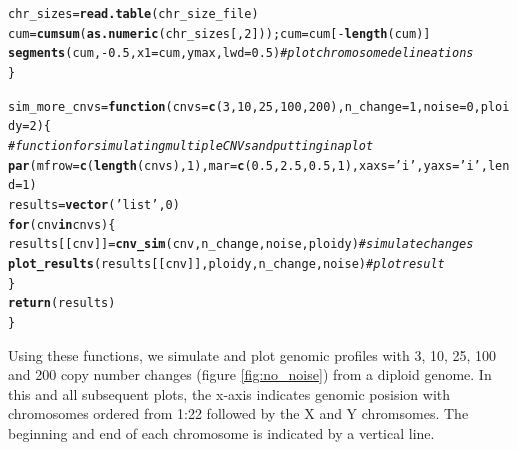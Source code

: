 \documentclass[12pt]{article}\usepackage[]{graphicx}\usepackage[]{color}
\makeatletter
\newcommand{\hlnum}[1]{\textcolor[rgb]{0.686,0.059,0.569}{#1}}%
\newcommand{\hlstr}[1]{\textcolor[rgb]{0.192,0.494,0.8}{#1}}%
\newcommand{\hlcom}[1]{\textcolor[rgb]{0.678,0.584,0.686}{\textit{#1}}}%
\newcommand{\hlopt}[1]{\textcolor[rgb]{0,0,0}{#1}}%
\newcommand{\hlstd}[1]{\textcolor[rgb]{0.345,0.345,0.345}{#1}}%
\newcommand{\hlkwa}[1]{\textcolor[rgb]{0.161,0.373,0.58}{\textbf{#1}}}%
\newcommand{\hlkwb}[1]{\textcolor[rgb]{0.69,0.353,0.396}{#1}}%
\newcommand{\hlkwc}[1]{\textcolor[rgb]{0.333,0.667,0.333}{#1}}%
\newcommand{\hlkwd}[1]{\textcolor[rgb]{0.737,0.353,0.396}{\textbf{#1}}}%
\newenvironment{kframe}{%
 \def\at@end@of@kframe{}%
 \ifinner\ifhmode%
  \def\at@end@of@kframe{\end{minipage}}%
  \begin{minipage}{\columnwidth}%
 \fi\fi%
 \def\FrameCommand##1{\hskip\@totalleftmargin \hskip-\fboxsep
 \colorbox{shadecolor}{##1}\hskip-\fboxsep
     \hskip-\linewidth \hskip-\@totalleftmargin \hskip\columnwidth}%
 \MakeFramed {\advance\hsize-\width
   \@totalleftmargin\z@ \linewidth\hsize
   \@setminipage}}%
 {\par\unskip\endMakeFramed%
 \at@end@of@kframe}
\newenvironment{knitrout}{}{} %
\makeatother
\begin{document}
\begin{knitrout}
\begin{kframe}
\begin{alltt}
  \hlstd{chr_sizes} \hlkwb{=} \hlkwd{read.table}\hlstd{(chr_size_file)}
  \hlstd{cum} \hlkwb{=} \hlkwd{cumsum}\hlstd{(}\hlkwd{as.numeric}\hlstd{(chr_sizes[,}\hlnum{2}\hlstd{])); cum} \hlkwb{=} \hlstd{cum[}\hlopt{-}\hlkwd{length}\hlstd{(cum)]}
  \hlkwd{segments}\hlstd{( cum,} \hlopt{-}\hlnum{0.5}\hlstd{,} \hlkwc{x1} \hlstd{= cum, ymax,} \hlkwc{lwd}\hlstd{=}\hlnum{0.5}\hlstd{)} \hlcom{#plot chromosome delineations}
\hlstd{\}}

\hlstd{sim_more_cnvs} \hlkwb{=} \hlkwa{function}\hlstd{(}\hlkwc{cnvs} \hlstd{=} \hlkwd{c}\hlstd{(}\hlnum{3}\hlstd{,}\hlnum{10}\hlstd{,}\hlnum{25}\hlstd{,}\hlnum{100}\hlstd{,}\hlnum{200}\hlstd{),} \hlkwc{n_change}\hlstd{=}\hlnum{1}\hlstd{,} \hlkwc{noise}\hlstd{=}\hlnum{0}\hlstd{,} \hlkwc{ploidy}\hlstd{=}\hlnum{2}\hlstd{)\{}
  \hlcom{#function for simulating multiple CNVs and putting in a plot}
  \hlkwd{par}\hlstd{(}\hlkwc{mfrow}\hlstd{=}\hlkwd{c}\hlstd{(}\hlkwd{length}\hlstd{(cnvs),}\hlnum{1}\hlstd{),} \hlkwc{mar}\hlstd{=}\hlkwd{c}\hlstd{(}\hlnum{0.5}\hlstd{,}\hlnum{2.5}\hlstd{,}\hlnum{0.5}\hlstd{,}\hlnum{1}\hlstd{),} \hlkwc{xaxs}\hlstd{=}\hlstr{'i'}\hlstd{,} \hlkwc{yaxs}\hlstd{=}\hlstr{'i'}\hlstd{,} \hlkwc{lend}\hlstd{=}\hlnum{1}\hlstd{)}
  \hlstd{results} \hlkwb{=} \hlkwd{vector}\hlstd{(}\hlstr{'list'}\hlstd{,} \hlnum{0}\hlstd{)}
  \hlkwa{for} \hlstd{(cnv} \hlkwa{in} \hlstd{cnvs)\{}
    \hlstd{results[[cnv]]} \hlkwb{=} \hlkwd{cnv_sim}\hlstd{(cnv, n_change, noise, ploidy)} \hlcom{#simulate changes}
    \hlkwd{plot_results}\hlstd{(results[[cnv]], ploidy, n_change, noise)} \hlcom{#plot result}
  \hlstd{\}}
  \hlkwd{return}\hlstd{(results)}
\hlstd{\}}
\end{alltt}
\end{kframe}
\end{knitrout}

\newpage
Using these functions, we simulate and plot genomic profiles with 3, 10, 25, 100 and 200 copy number changes (figure \ref{fig:no_noise}) from a diploid genome. In this and all subsequent plots, the x-axis indicates genomic posision with chromosomes ordered from 1:22 followed by the X and Y chromsomes. The beginning and end of each chromosome is indicated by a vertical line.
\end{document}
